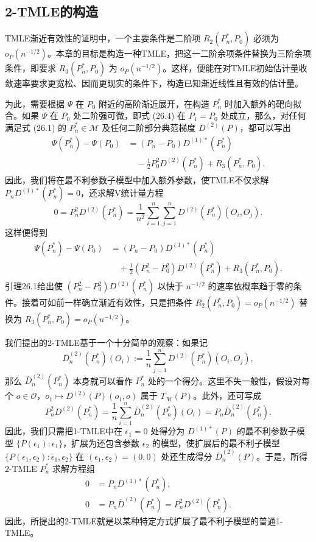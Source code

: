 \subsection{2-TMLE的构造}

TMLE渐近有效性的证明中，一个主要条件是二阶项 $R_2(P_n^*,P_0)$ 必须为 $o_P(n^{-1/2})$。本章的目标是构造一种TMLE，把这一二阶余项条件替换为三阶余项条件，即要求 $R_3(P_n^*,P_0)$ 为 $o_P(n^{-1/2})$。这样，便能在对TMLE初始估计量收敛速率要求更宽松、因而更现实的条件下，构造已知渐近线性且有效的估计量。

为此，需要根据 $\Psi$ 在 $P_0$ 附近的高阶渐近展开，在构造 $P_n^*$ 时加入额外的靶向拟合。如果 $\Psi$ 在 $P_0$ 处二阶强可微，即式 (26.4) 在 $P_1=P_0$ 处成立，那么，对任何满足式 (26.1) 的 $P_n^*\in\mathcal M$ 及任何二阶部分典范梯度 $D^{(2)}(P)$，都可以写出
\[
\begin{aligned}
\Psi(P_n^*)-\Psi(P_0)
 &= (P_n-P_0)D^{(1)*}(P_n^*)\\
 &\quad-\frac12P_0^2D^{(2)}(P_n^*)+R_3(P_n^*,P_0).
\end{aligned}
\]
因此，我们将在最不利参数子模型中加入额外参数，使TMLE不仅求解 $P_nD^{(1)*}(P_n^*)=0$，还求解V统计量方程
\[
0=P_n^2D^{(2)}(P_n^*)=\frac1{n^2}\sum_{i=1}^n\sum_{j=1}^nD^{(2)}(P_n^*)(O_i,O_j).
\]
这样便得到
\[
\begin{aligned}
\Psi(P_n^*)-\Psi(P_0)
 &= (P_n-P_0)D^{(1)*}(P_n^*)\\
 &\quad+\frac12(P_n^2-P_0^2)D^{(2)}(P_n^*)+R_3(P_n^*,P_0).
\end{aligned}
\]
引理26.1给出使 $(P_n^2-P_0^2)D^{(2)}(P_n^*)$ 以快于 $n^{-1/2}$ 的速率依概率趋于零的条件。接着可如前一样确立渐近有效性，只是把条件 $R_2(P_n^*,P_0)=o_P(n^{-1/2})$ 替换为 $R_3(P_n^*,P_0)=o_P(n^{-1/2})$。

我们提出的2-TMLE基于一个十分简单的观察：如果记
\[
\bar D_n^{(2)}(P_n^*)(O_i):=\frac1n\sum_{j=1}^nD^{(2)}(P_n^*)(O_i,O_j),
\]
那么 $\bar D_n^{(2)}(P_n^*)$ 本身就可以看作 $P_n^*$ 处的一个得分。这里不失一般性，假设对每个 $o\in\mathcal O$，$o_1\mapsto D^{(2)}(P)(o_1,o)$ 属于 $T_{\mathcal M}(P)$。此外，还可写成
\[
P_n^2D^{(2)}(P_n^*)=\frac1n\sum_{i=1}^n\bar D_n^{(2)}(P_n^*)(O_i)
=P_n\bar D_n^{(2)}(P_n^*).
\]
因此，我们只需把1-TMLE中在 $\epsilon_1=0$ 处得分为 $D^{(1)*}(P)$ 的最不利参数子模型 $\{P(\epsilon_1):\epsilon_1\}$，扩展为还包含参数 $\epsilon_2$ 的模型，使扩展后的最不利子模型 $\{P(\epsilon_1,\epsilon_2):\epsilon_1,\epsilon_2\}$ 在 $(\epsilon_1,\epsilon_2)=(0,0)$ 处还生成得分 $\bar D_n^{(2)}(P)$。于是，所得2-TMLE $P_n^*$ 求解方程组
\[
\begin{aligned}
0&=P_nD^{(1)*}(P_n^*),\\
0&=P_n\bar D^{(2)}(P_n^*)=P_n^2D^{(2)}(P_n^*).
\end{aligned}
\]
因此，所提出的2-TMLE就是以某种特定方式扩展了最不利子模型的普通1-TMLE。

